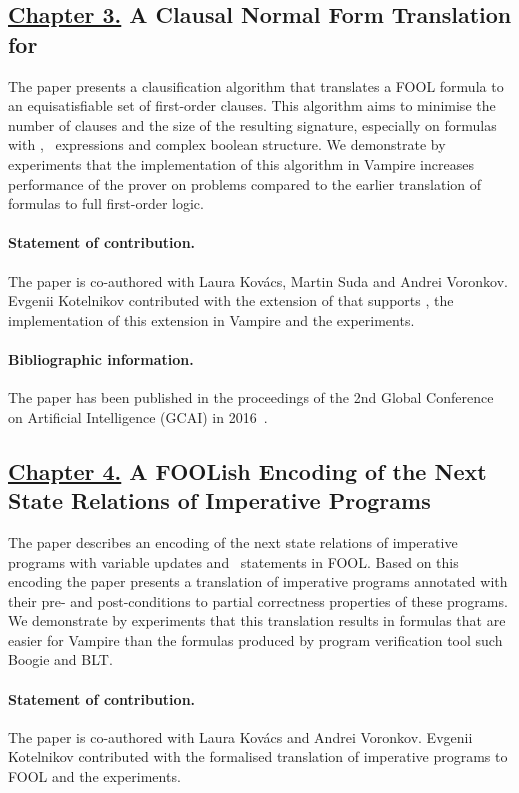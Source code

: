 \subsection*{\hyperref[chap:cnf]{Chapter 3.} A Clausal Normal Form Translation\\for \folb{}}
The paper presents a clausification algorithm that translates a FOOL formula to an equisatisfiable set of first-order clauses. This algorithm aims to minimise the number of clauses and the size of the resulting signature, especially on formulas with \ITE, \LETIN\ expressions and complex boolean structure. We demonstrate by experiments that the implementation of this algorithm in Vampire increases performance of the prover on \folb{} problems compared to the earlier translation of \folb{} formulas to full first-order logic.

\paragraph{Statement of contribution.} The paper is co-authored with Laura Kov\'{a}cs, Martin Suda and Andrei Voronkov. Evgenii Kotelnikov contributed with the extension of \newcnf{} that supports \folb{}, the implementation of this extension in Vampire and the experiments.

\paragraph{Bibliographic information.} The paper has been published in the proceedings of the 2nd Global Conference on Artificial Intelligence (GCAI) in 2016~\cite{FOOLCNF}.

\subsection*{\hyperref[chap:boogie]{Chapter 4.} A FOOLish Encoding of the Next State Relations of Imperative Programs}
The paper describes an encoding of the next state relations of imperative programs with variable updates and \ITE\ statements in FOOL. Based on this encoding the paper presents a translation of imperative programs annotated with their pre- and post-conditions to partial correctness properties of these programs. We demonstrate by experiments that this translation results in formulas that are easier for Vampire than the formulas produced by program verification tool such Boogie and BLT.

\paragraph{Statement of contribution.} The paper is co-authored with Laura Kov\'{a}cs and Andrei Voronkov. Evgenii Kotelnikov contributed with the formalised translation of imperative programs to FOOL and the experiments.

